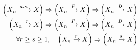 \begin{theorem}
    \begin{align}
        \qty(X_n \xrightarrow{a.s.} X) \Rightarrow \qty(X_n \xrightarrow{P} X) \Rightarrow \qty(X_n \xrightarrow{D} X) \\
        \qty(X_n \xrightarrow{r} X) \Rightarrow \qty(X_n \xrightarrow{P} X) \Rightarrow \qty(X_n \xrightarrow{D} X) \\
        \forall r \geq s \geq 1, \quad \qty(X_n \xrightarrow{r} X) \Rightarrow \qty(X_n \xrightarrow{s} X)
    \end{align}
\end{theorem}
